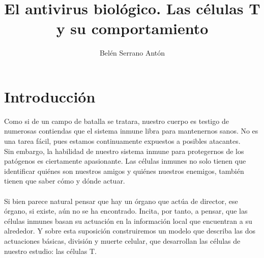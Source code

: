 \documentclass{article}
\title{	\xout{¿Cómo nos defendemos de los patógenos?} El antivirus biológico. Las células T y su comportamiento}
\author{Belén Serrano Antón }
\begin{document}
	
	\begin{titlepage}
		\maketitle
	\end{titlepage}
	
	\section{Introducción}
	
	Como si de un campo de batalla se tratara, nuestro cuerpo es testigo de numerosas contiendas que el sistema inmune libra para mantenernos sanos. No es una tarea fácil, pues estamos continuamente expuestos a posibles atacantes.
	\\
	Sin embargo, la habilidad de nuestro sistema inmune para protegernos de los patógenos es ciertamente apasionante. Las células inmunes no solo tienen que identificar quiénes son nuestros amigos y quiénes nuestros enemigos, también tienen que saber cómo y dónde actuar.
	\\
	\\
	Si bien parece natural pensar que hay un órgano que actúa de director, ese órgano, si existe, aún no se ha encontrado. Incita, por tanto, a pensar, que las células inmunes basan su actuación en la información local que encuentran a su alrededor. Y sobre esta suposición construiremos un modelo que describa las dos actuaciones básicas, división y muerte celular, que desarrollan las células de nuestro estudio: las células T.
	
\end{document}
